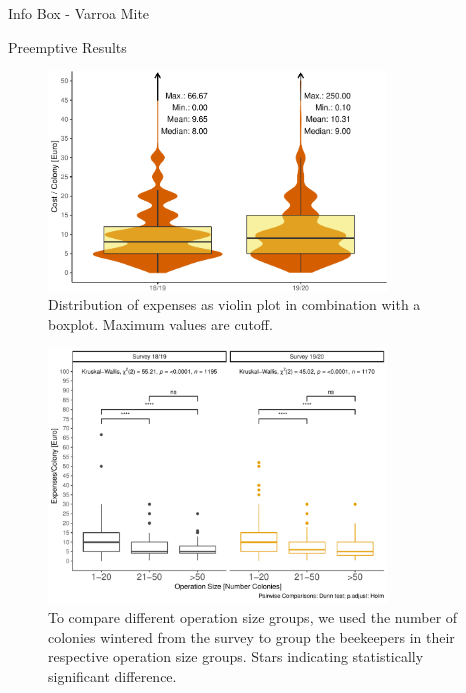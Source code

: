 \documentclass{beamer}
\begin{document}
\begin{frame}{}
\begin{columns}[t]
\begin{column}{0.49\textwidth}
{\begin{block}{Info Box - Varroa Mite}
      \end{block}
    }
    
    \begin{block}{Preemptive Results}
      \begin{figure}
        \centering
        \includegraphics[width=0.8\textwidth]{img/distr-year-1.pdf}
        \caption{Distribution of expenses as violin plot in combination with a boxplot. Maximum values are cutoff.}
      \end{figure}

      \hrulefill
      \vspace{0pt}

      \begin{figure}
        \centering
        \includegraphics[width=0.8\textwidth]{img/operation.pdf}
        \caption{To compare different operation size groups, we used the number of colonies wintered from the survey to group the beekeepers in their respective operation size groups. Stars indicating statistically significant difference.}
      \end{figure}
    \end{block}
    

\end{column}
\end{columns}
\end{frame}
\end{document}
